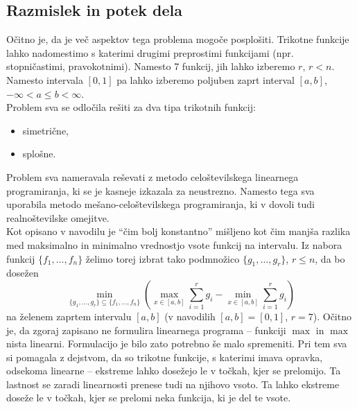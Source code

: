 \documentclass[11pt]{article}
\theoremstyle{definition}
\newcommand{\1}{\mathbbm{1}}
\newcommand{\set}[1]{\{#1\}}
\begin{document}

\subsection{Razmislek in potek dela}
\vspace{0.5cm}

Očitno je, da je več aspektov tega problema mogoče posplošiti. Trikotne funkcije lahko nadomestimo s katerimi drugimi preprostimi funkcijami (npr. stopničastimi, pravokotnimi). Namesto 7 funkcij, jih lahko izberemo $r$, $r < n$. Namesto intervala $[0,1]$ pa lahko izberemo poljuben zaprt interval $[a,b]$, $-\infty < a \leq b < \infty$. \\

Problem sva se odločila rešiti za dva tipa trikotnih funkcij:
\begin{itemize}
	\item simetrične,
	\item splošne.
\end{itemize}

Problem sva nameravala reševati z metodo celoštevilskega linearnega programiranja, ki se je kasneje izkazala za neustrezno. Namesto tega sva uporabila metodo mešano-celoštevilskega programiranja, ki v dovoli tudi realnoštevilske omejitve. \\

Kot opisano v navodilu je ``čim bolj konstantno'' mišljeno kot čim manjša razlika med maksimalno in minimalno vrednostjo vsote funkcij na intervalu. Iz nabora funkcij $\set{f_1,\ldots,f_n}$ želimo torej izbrat tako podmnožico $\set{g_1,\ldots,g_r}$, $r \leq n$, da bo dosežen
$$\min_{\set{g_1,\ldots,g_r} \subseteq \set{f_1,\ldots,f_n}}\left({\max_{x \in [a,b]}\sum_{i=1}^r g_i - \min_{x \in [a,b]}\sum_{i=1}^r g_i}\right)$$
na želenem zaprtem intervalu $[a,b]$ (v navodilih $[a,b]=[0,1]$, $r=7$). Očitno je, da zgoraj zapisano ne formulira linearnega programa -- funkciji $\max$ in $\max$ nista linearni. Formulacijo je bilo zato potrebno še malo spremeniti. Pri tem sva si pomagala z dejstvom, da so trikotne funkcije, s katerimi imava opravka, odsekoma linearne -- ekstreme lahko dosežejo le v točkah, kjer se prelomijo. Ta lastnost se zaradi linearnosti prenese tudi na njihovo vsoto. Ta lahko ekstreme doseže le v točkah, kjer se prelomi neka funkcija, ki je del te vsote. 

\end{document}

